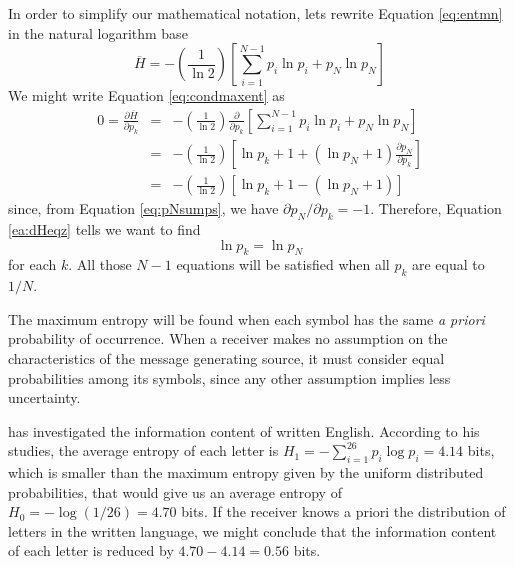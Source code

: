 In order to simplify our mathematical notation, lets rewrite Equation \ref{eq:entmn}
in the natural logarithm base
\begin{equation}
\label{eq:entmne}
\overline{H} = - \left( \frac{1}{\ln 2} \right) \left[ \sum_{i=1}^{N-1} p_i \ln p_i + p_N \ln p_N \right]
\end{equation}
We might write Equation \ref{eq:condmaxent} as
\begin{eqnarray}
\label{ea:dHeqz}
0 = \frac{\partial \overline{H}}{ \partial p_k } &=&  - \left( \frac{1}{\ln 2} \right) \frac{\partial}{ \partial p_k } \left[ \sum_{i=1}^{N-1} p_i \ln p_i  + p_N \ln p_N \right] \nonumber \\
   &=& - \left( \frac{1}{\ln 2} \right) \left[ \ln p_k + 1 + (\ln p_N + 1) \frac{\partial p_N}{ \partial p_k }  \right] \nonumber \\
   &=& - \left( \frac{1}{\ln 2} \right) \left[ \ln p_k + 1 - (\ln p_N + 1) \right] 
\end{eqnarray}
since, from Equation \ref{eq:pNsumps}, we have $\partial p_N / \partial p_k = -1$.  
Therefore, Equation \ref{ea:dHeqz} tells we want to find 
\begin{equation}
\ln p_k = \ln p_N
\end{equation}
for each $k$. All those $N-1$ equations will be satisfied when all $p_k$ are equal
to $1/N$. 

The maximum entropy will be found when each symbol has the same \emph{a priori} probability 
of occurrence. When a receiver makes no assumption on the characteristics of the
message generating source, it must consider equal probabilities among its symbols,
since any other assumption implies less uncertainty.

\cite{shannon1951} has investigated the information content of written English.
According to his studies, the average entropy of each letter is 
$H_1 = - \sum_{i=1}^{26} p_i \log p_i = 4.14$ bits, which
is smaller than the maximum entropy given by the uniform distributed probabilities,
that would give us an average entropy of $H_0 = -\log (1/26) = 4.70$ bits.
If the receiver knows a priori the distribution of letters in the written language,
we might conclude that the information content of each letter is reduced by
$4.70 - 4.14 = 0.56$ bits.

